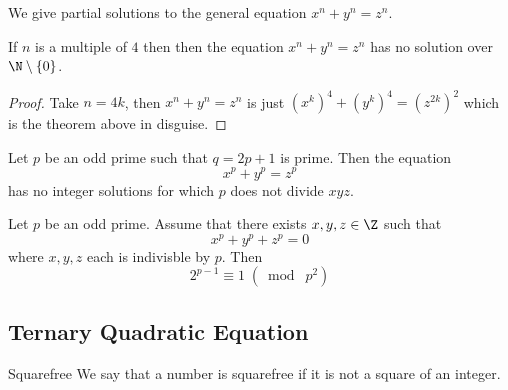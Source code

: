 We give partial solutions to the general equation $x^n+y^n=z^n$. 

\begin{crl}{}{} If $n$ is a multiple of $4$ then then the equation $x^n+y^n=z^n$ has no solution over $\N\setminus\{0\}$. \tcbline
\begin{proof}
Take $n=4k$, then $x^n+y^n=z^n$ is just $(x^k)^4+(y^k)^4=(z^{2k})^2$ which is the theorem above in disguise. 
\end{proof}
\end{crl}

\begin{thm}{}{} Let $p$ be an odd prime such that $q=2p+1$ is prime. Then the equation $$x^p+y^p=z^p$$ has no integer solutions for which $p$ does not divide $xyz$. 
\end{thm}

\begin{thm}{}{} Let $p$ be an odd prime. Assume that there exists $x,y,z\in\Z$ such that $$x^p+y^p+z^p=0$$ where $x,y,z$ each is indivisble by $p$. Then $$2^{p-1}\equiv 1\;(\bmod\; p^2)$$
\end{thm}

\subsection{Ternary Quadratic Equation}
\begin{defn}{Squarefree}{} We say that a number is squarefree if it is not a square of an integer. 
\end{defn}

